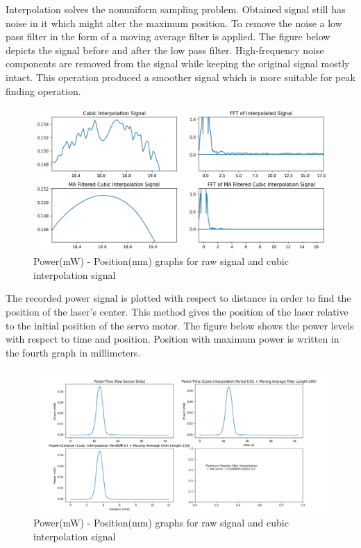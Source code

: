 Interpolation solves the nonuniform sampling problem.
Obtained signal still has noise in it which might alter
the maximum position. To remove the noise a low pass
filter in the form of a moving average filter is applied.
The figure below depicts the signal before and after the
low pass filter. High-frequency noise components are
removed from the signal while keeping the original signal
mostly intact. This operation produced a smoother signal
which is more suitable for peak finding operation.


\begin{figure}[!htb]\centering
    \includegraphics*[width = 16cm]{bilder/project/error_test_graph_2.png}
    \caption{Power(mW) - Position(mm) graphs for raw signal and cubic interpolation signal}
    \label{fig:error_test_graph_2}
\end{figure}


The recorded power signal is plotted with respect to distance
in order to find the position of the laser's center. This method
gives the position of the laser relative to the initial position
of the servo motor. The figure below shows the power levels with
respect to time and position. Position with maximum power is written
in the fourth graph in millimeters.


\begin{figure}[!htb]\centering
    \includegraphics*[width = 16cm]{bilder/project/error_test_graph_3.png}
    \caption{Power(mW) - Position(mm) graphs for raw signal and cubic interpolation signal}
    \label{fig:error_test_graph_3}
\end{figure}


